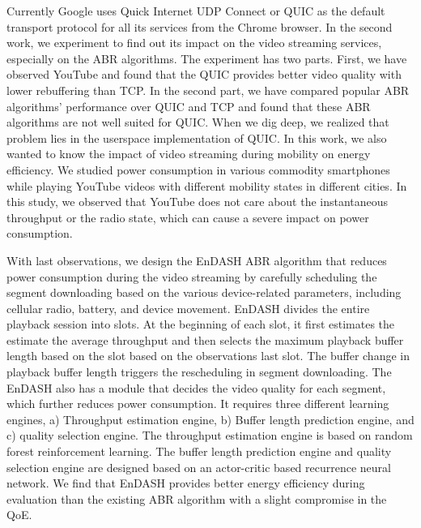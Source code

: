 {\indent Currently Google uses Quick Internet UDP Connect or QUIC as the default transport protocol for all its services from the Chrome browser. In the second  work, we experiment to find out its impact on the video streaming services, especially on the ABR algorithms. The experiment has two parts. First, we have observed YouTube and found that the QUIC provides better video quality with lower rebuffering than TCP. In the second part, we have compared popular ABR algorithms' performance over QUIC and TCP and found that these ABR algorithms are not well suited for QUIC. When we dig deep, we realized that problem lies in the userspace implementation of QUIC. In this work, we also wanted to know the impact of video streaming during mobility on energy efficiency. We studied power consumption in various commodity smartphones while playing YouTube videos with different mobility states in different cities. In this study, we observed that YouTube does not care about the instantaneous throughput or the radio state, which can cause a severe impact on power consumption.

With last observations, we design the EnDASH ABR algorithm that reduces power consumption during the video streaming by carefully scheduling the segment downloading based on the various device-related parameters, including cellular radio, battery, and device movement. EnDASH divides the entire playback session into slots. At the beginning of each slot, it first estimates the estimate the average throughput and then selects the maximum playback buffer length based on the slot based on the observations last slot. The buffer change in playback buffer length triggers the rescheduling in segment downloading. The EnDASH also has a module that decides the video quality for each segment, which further reduces power consumption. It requires three different learning engines, a) Throughput estimation engine, b) Buffer length prediction engine, and c) quality selection engine. The throughput estimation engine is based on random forest reinforcement learning. The buffer length prediction engine and quality selection engine are designed based on an actor-critic based recurrence neural network. We find that EnDASH provides better energy efficiency during evaluation than the existing ABR algorithm with a slight compromise in the QoE.

}

